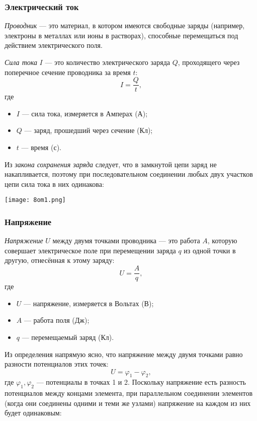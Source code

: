 \documentclass[12pt, a4paper]{article}%
\begin{document}
\subsubsection*{Электрический ток}

\textit{Проводник} — это материал, в котором имеются свободные заряды (например, электроны в металлах или ионы в растворах), способные перемещаться под действием электрического поля.

\textit{Сила тока} $I$ — это количество электрического заряда $Q$, проходящего через поперечное сечение проводника за время $t$:
\[
I = \frac{Q}{t},
\]
где
\begin{itemize}
  \item $I$ — сила тока, измеряется в Амперах (А);
  \item $Q$ — заряд, прошедший через сечение (Кл);
  \item $t$ — время (с).
\end{itemize}
Из \textit{закона сохранения заряда} следует, что в замкнутой цепи заряд не накапливается, поэтому при последовательном соединении любых 
двух участков цепи сила тока в них одинакова:

\begin{center}
\texttt{[image: 8om1.png]}
\label{fig:mpr}
\end{center}

\subsubsection*{Напряжение}
\textit{Напряжение} $U$ между двумя точками проводника — это работа $A$, которую совершает электрическое поле при перемещении заряда $q$ из одной точки в другую, отнесённая к этому заряду:
\[
U = \frac{A}{q},
\]
где
\begin{itemize}
  \item $U$ — напряжение, измеряется в Вольтах (В);
  \item $A$ — работа поля (Дж);
  \item $q$ — перемещаемый заряд (Кл).
\end{itemize}

Из определения напрямую ясно, что напряжение между двумя точками равно разности потенциалов этих точек:
\[
U = \varphi_1 - \varphi_2,
\]
где $\varphi_1,\varphi_2$ — потенциалы в точках 1 и 2. Поскольку напряжение есть разность потенциалов между концами элемента,
при параллельном соединении элементов (когда они соединены одними и теми же узлами) напряжение на каждом из них будет одинаковым:
\end{document}
